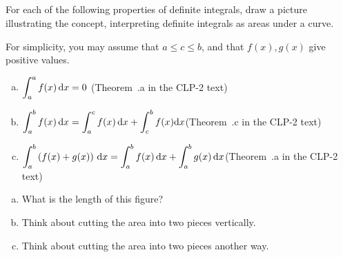 %
%

\subsection*{\Conceptual}
\begin{question}
For each of the following properties of definite integrals, draw a picture illustrating the concept, interpreting definite integrals as areas under a curve.

For simplicity, you may assume that $a \leq c \leq b$, and that $f(x),g(x)$ give positive values.
\begin{enumerate}[(a)]
\item $\displaystyle\int_a^a f(x)\,\mathrm{d}x=0$\qquad
(Theorem~.a in the CLP-2 text)
\item $\displaystyle\int_a^b f(x)\,\mathrm{d}x= \displaystyle\int_a^c f(x)\,\mathrm{d}x + \int_c^b f(x)\mathrm{d}x $\qquad (Theorem~.c in the CLP-2 text)
\item $\displaystyle\int_a^b \left( f(x) + g(x) \right)\,\mathrm{d}x
= \displaystyle\int_a^b f(x)\,\mathrm{d}x + \displaystyle\int_a^b g(x)\,\mathrm{d}x$\qquad (Theorem~.a  in the CLP-2 text)
\end{enumerate}
\end{question}
\begin{hint}
\begin{enumerate}[(a)]
\item What is the length of this figure?
\item Think about cutting the area into two pieces vertically.
\item Think about cutting the area into two pieces another way.
\end{enumerate}
\end{hint}
